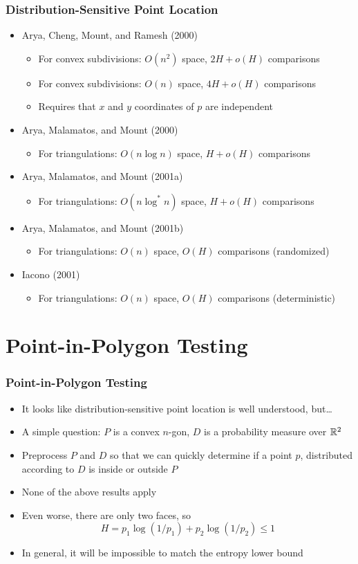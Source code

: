 \documentclass{beamer}
\begin{document}
\frame
{
   \frametitle{Distribution-Sensitive Point Location}
   \begin{itemize}
   \item<2-> Arya, Cheng, Mount, and Ramesh (2000)
    \begin{itemize}
      \item<2->For convex subdivisions: $O(n^2)$ space, $2H+o(H)$ comparisons
      \item<2->For convex subdivisions: $O(n)$ space, $4H+o(H)$ comparisons
      \item<2->Requires that $x$ and $y$ coordinates of $p$ are independent
    \end{itemize}
   \item<3-> Arya, Malamatos, and Mount (2000)
    \begin{itemize}
      \item<3->For triangulations: $O(n\log n)$ space, $H+o(H)$ comparisons
    \end{itemize} 
    \item<4-> Arya, Malamatos, and Mount (2001a)
    \begin{itemize}
      \item<4->For triangulations: $O(n\log^* n)$ space, $H+o(H)$ comparisons
    \end{itemize} 
    \item<5-> Arya, Malamatos, and Mount (2001b)
    \begin{itemize}
      \item<5->For triangulations: $O(n)$ space, $O(H)$ comparisons (randomized)
    \end{itemize} 
    \item<6-> Iacono (2001)
    \begin{itemize}
      \item<6->For triangulations: $O(n)$ space, $O(H)$ comparisons (deterministic)
    \end{itemize} 
   \end{itemize}


}

\section{Point-in-Polygon Testing}
\frame
{
   \frametitle{Point-in-Polygon Testing}
   \begin{itemize}
   \item<1-> It looks like distribution-sensitive point location is 
	well understood, but\ldots
   \item<2-> A simple question: $P$ is a convex $n$-gon, $D$ is a
	probability measure over $\mathbb{R}^2$
   \item<3-> Preprocess $P$ and $D$ so that we can quickly determine if a
point $p$, distributed according to $D$ is inside or outside $P$
   \item<4-> None of the above results apply
   \item<5-> Even worse, there are only two faces, so
     \[ H= p_1\log (1/p_1) + p_2\log(1/p_2) \le 1  \]
   \item<6-> In general, it will be impossible to match the entropy
	lower bound
   \end{itemize}
}
\end{document}
